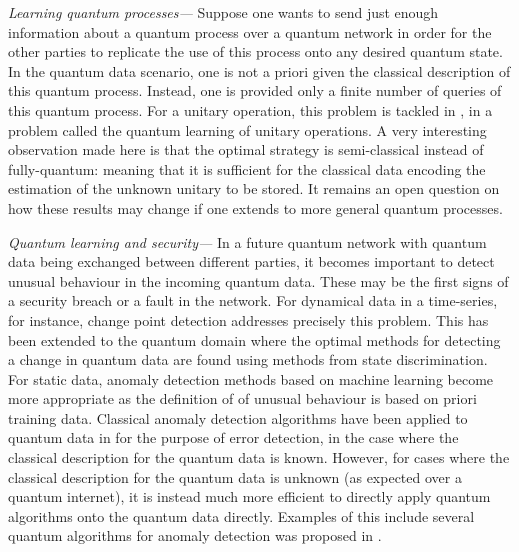 \documentclass[twocolumn, aps, rmp, amsmath, amssymb, nofootinbib, superscriptaddress, longbibliography, floatfix, table-of-contents, eqsecnum]{revtex4-2}
\begin{document}
\textit{Learning quantum processes---} Suppose one wants to send just enough information about a quantum process over a quantum network in order for the other parties to replicate the use of this process onto any desired quantum state. In the quantum data scenario, one is not a priori given the classical description of this quantum process. Instead, one is provided only a finite number of queries of this quantum process. For a unitary operation, this problem is tackled in \cite{bisio_optimal_2010}, in a problem called the quantum learning of unitary operations. A very interesting observation made here is that the optimal strategy is semi-classical instead of fully-quantum: meaning that it is sufficient for the classical data encoding the estimation of the unknown unitary to be stored. It remains an open question on how these results may change if one extends to more general quantum processes.

\textit{Quantum learning and security---} In a future quantum network with quantum data being exchanged between different parties, it becomes important to detect unusual behaviour in the incoming quantum data. These may be the first signs of a security breach or a fault in the network. For dynamical data in a time-series, for instance, change point detection addresses precisely this problem. This has been extended to the quantum domain \cite{gael1,gael2} where the optimal methods for detecting a change in quantum data are found using methods from state discrimination. For static data, anomaly detection methods based on machine learning become more appropriate as the definition of of unusual behaviour is based on priori training data. Classical anomaly detection algorithms have been applied to quantum data in \cite{sara} for the purpose of error detection, in the case where the classical description for the quantum data is known. However, for cases where the classical description for the quantum data is unknown (as expected over a quantum internet), it is instead much more efficient to directly apply quantum algorithms onto the quantum data directly. Examples of this include several quantum algorithms for anomaly detection was proposed in \cite{liu2018quantum}.


\end{document}
